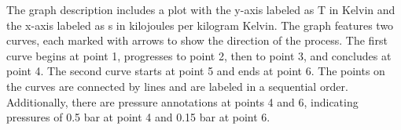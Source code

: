 The graph description includes a plot with the y-axis labeled as T in Kelvin and the x-axis labeled as s in kilojoules per kilogram Kelvin. The graph features two curves, each marked with arrows to show the direction of the process. The first curve begins at point 1, progresses to point 2, then to point 3, and concludes at point 4. The second curve starts at point 5 and ends at point 6. The points on the curves are connected by lines and are labeled in a sequential order. Additionally, there are pressure annotations at points 4 and 6, indicating pressures of 0.5 bar at point 4 and 0.15 bar at point 6.